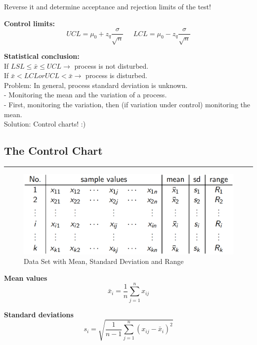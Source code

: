 Reverse it and determine acceptance and rejection limits of the test!

\textbf{Control limits:}
\begin{equation}
  UCL = \mu_0 + z_q \frac{\sigma}{\sqrt{n}} \;\;\;\;\; LCL = \mu_0 - z_q \frac{\sigma}{\sqrt{n}}
\end{equation}

\textbf{Statistical conclusion:}\\
If $LSL \leq \bar{x} \leq UCL \rightarrow$ process is not disturbed.\\
If $\bar{x} < LCL or UCL < \bar{x} \rightarrow$ process is disturbed.\\

Problem: In general, process standard deviation is unknown.\\
 - Monitoring the mean and the variation of a process.\\
 - First, monitoring the variation, then (if variation under control) monitoring the mean.\\

Solution: Control charts! :)




\subsection{The Control Chart}
\noindent\rule[\linienAbstand]{\linewidth}{\linienDicke}
\begin{figure}[H]
  \centering
  \includegraphics[width = 0.8\linewidth]{Pics/2.1.png}
  \caption{Data Set with Mean, Standard Deviation and Range}
  \label{2.1}
\end{figure}

\textbf{Mean values}
\begin{equation}
  \bar{x}_i = \frac{1}{n} \sum_{j=1}^n x_{ij}
\end{equation}

\textbf{Standard deviations}
\begin{equation}
  s_i = \sqrt{\frac{1}{n-1} \sum_{j=1}^n \left(x_{ij} - \bar{x}_i\right)^2}
\end{equation}

